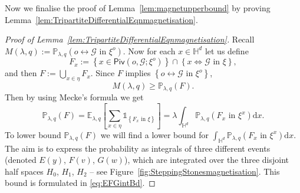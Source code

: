\documentclass[10pt,a4paper,dvipsnames]{article}
\theoremstyle{definition}
\theoremstyle{remark}
\newcommand{\plaq}{\mathbb{P}_{\lambda,q}}
\newcommand{\elaq}{\mathbb E_{\lambda,q}}
\newcommand{\HypDim}{{\mathbb{H}^d}}
\newcommand{\dd}{\mathrm{d}} %
\newcommand{\piv}[1]{\mathsf {Piv}(#1)}
\newcommand{\Gcal}{\mathcal{G}}
\newcommand{\conn}[3]{#1 \longleftrightarrow #2\textrm { in } #3}
\newcommand{\dconn}[3]{#1 \Longleftrightarrow #2\textrm { in } #3}
\newcommand{\Id}{\mathds 1}
\newcommand{\orig}{o}
\numberwithin{equation}{section}
\begin{document}
Now we finalise the proof of Lemma~\ref{lem:magnetupperbound} by proving Lemma~\ref{lem:TripartiteDifferentialEqnmagnetisation}.
\begin{proof}[Proof of Lemma~\ref{lem:TripartiteDifferentialEqnmagnetisation}]
    Recall $M\left(\lambda,q\right):= \plaq\left(\conn{\orig}{\Gcal}{\xi^\orig}\right)$. Now for each $x\in\HypDim$ let us define
    \begin{equation}
        F_x:=\left\{x\in\piv{\orig,\Gcal;\xi^{\orig}}\right\}\cap \left\{\dconn{x}{\Gcal}{\xi}\right\},
    \end{equation}
    and then $F:= \bigcup_{x\in\eta}F_x$. Since $F$ implies $\left\{\conn{\orig}{\Gcal}{\xi^\orig}\right\}$,
    \begin{equation}
        M\left(\lambda,q\right) \geq \plaq\left(F\right).
    \end{equation}
    Then by using Mecke's formula we get
    \begin{equation}
        \plaq\left(F\right) = \elaq\left[\sum_{x\in\eta}\Id_{\left\{F_x\text{ in }\xi\right\}}\right] =\lambda\int_{\HypDim}\plaq\left(F_x\text{ in }\xi^{x}\right)\dd x.
    \end{equation}
    To lower bound $\plaq\left(F\right)$ we will find a lower bound for $\int_{\HypDim}\plaq\left(F_x\text{ in }\xi^{x}\right)\dd x$. The aim is to express the probability as integrals of three different events (denoted $E(y)$, $F(v)$, $G(w)$), which are integrated over the three disjoint half spaces $H_0$, $H_1$, $H_2$ -- see Figure~\ref{fig:SteppingStonesmagnetisation}. This bound is formulated in \eqref{eq:EFGintBd}.


\end{proof}
\end{document}
